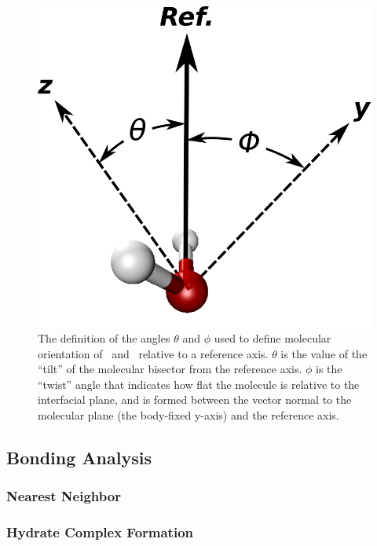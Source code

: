 \begin{figure}[h!]
	\begin{center}
		\includegraphics[scale=1.0]{images/wateranglessmall.png}
		\caption{The definition of the angles $\theta$ and $\phi$ used to define molecular orientation of \suldiox~and \wat~relative to a reference axis. $\theta$ is the value of the ``tilt'' of the molecular bisector from the reference axis. $\phi$ is the ``twist'' angle that indicates how flat the molecule is relative to the interfacial plane, and is formed between the vector normal to the molecular plane (the body-fixed y-axis) and the reference axis.}
		\label{fig:water-angles}
	\end{center}
\end{figure}

\subsection{Bonding Analysis}
\subsubsection{Nearest Neighbor}
\subsubsection{Hydrate Complex Formation}
